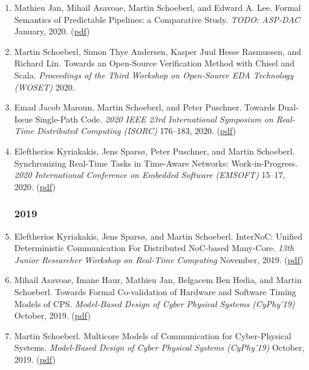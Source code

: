 \begin{enumerate}
\item Mathieu Jan, Mihail Asavoae, Martin Schoeberl, and Edward A. Lee.
 Formal Semantics of Predictable Pipelines: a Comparative Study.
 \emph{TODO: ASP-DAC} January, 2020.
(\href{https://www.jopdesign.com/doc/verifypat.pdf}{pdf})

\item Martin Schoeberl, Simon Thye Andersen, Kasper Juul Hesse Rasmussen, and Richard Lin.
 Towards an Open-Source Verification Method with Chisel and Scala.
 \emph{Proceedings of the Third Workshop on Open-Source EDA Technology (WOSET)} 2020.


\item Emad Jacob Maroun, Martin Schoeberl, and Peter Puschner.
 Towards Dual-Issue Single-Path Code.
 \emph{2020 IEEE 23rd International Symposium on Real-Time Distributed Computing (ISORC)} 176--183, 2020.
(\href{https://www.jopdesign.com/doc/spvliw.pdf}{pdf})

\item Eleftherios Kyriakakis, Jens Spars{\o}, Peter Puschner, and Martin Schoeberl.
 Synchronizing Real-Time Tasks in Time-Aware Networks: Work-in-Progress.
 \emph{2020 International Conference on Embedded Software (EMSOFT)} 15--17, 2020.
(\href{https://www.jopdesign.com/doc/ttetask-wip.pdf}{pdf})


\subsubsection*{2019}

\item Eleftherios Kyriakakis, Jens Spars{\o}, and Martin Schoeberl.
 InterNoC: Unified Deterministic Communication For Distributed NoC-based Many-Core.
 \emph{13th Junior Researcher Workshop on Real-Time Computing} November, 2019.
(\href{https://www.jopdesign.com/doc/internoc-jrwrtc.pdf}{pdf})

\item Mihail Asavoae, Imane Haur, Mathieu Jan, Belgacem Ben Hedia, and Martin Schoeberl.
 Towards Formal Co-validation of Hardware and Software Timing Models of CPS.
 \emph{Model-Based Design of Cyber Physical Systems (CyPhy'19)} October, 2019.
(\href{https://www.jopdesign.com/doc/lipsi-models.pdf}{pdf})

\item Martin Schoeberl.
 Multicore Models of Communication for Cyber-Physical Systems.
 \emph{Model-Based Design of Cyber Physical Systems (CyPhy'19)} October, 2019.
(\href{https://www.jopdesign.com/doc/modcom-cyphy.pdf}{pdf})


\end{enumerate}
